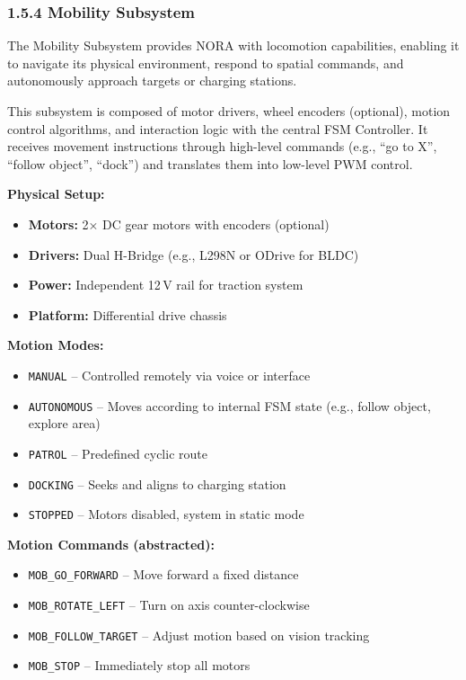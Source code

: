 \subsubsection*{1.5.4 Mobility Subsystem}

The Mobility Subsystem provides NORA with locomotion capabilities, enabling it to navigate its physical environment, respond to spatial commands, and autonomously approach targets or charging stations.

This subsystem is composed of motor drivers, wheel encoders (optional), motion control algorithms, and interaction logic with the central FSM Controller. It receives movement instructions through high-level commands (e.g., “go to X”, “follow object”, “dock”) and translates them into low-level PWM control.

\vspace{0.5cm}

\noindent\textbf{Physical Setup:}
\begin{itemize}
    \item \textbf{Motors:} 2× DC gear motors with encoders (optional)
    \item \textbf{Drivers:} Dual H-Bridge (e.g., L298N or ODrive for BLDC)
    \item \textbf{Power:} Independent 12 V rail for traction system
    \item \textbf{Platform:} Differential drive chassis
\end{itemize}

\vspace{0.5cm}

\noindent\textbf{Motion Modes:}
\begin{itemize}
    \item \texttt{MANUAL} – Controlled remotely via voice or interface
    \item \texttt{AUTONOMOUS} – Moves according to internal FSM state (e.g., follow object, explore area)
    \item \texttt{PATROL} – Predefined cyclic route
    \item \texttt{DOCKING} – Seeks and aligns to charging station
    \item \texttt{STOPPED} – Motors disabled, system in static mode
\end{itemize}

\vspace{0.5cm}

\noindent\textbf{Motion Commands (abstracted):}
\begin{itemize}
    \item \texttt{MOB\_GO\_FORWARD} – Move forward a fixed distance
    \item \texttt{MOB\_ROTATE\_LEFT} – Turn on axis counter-clockwise
    \item \texttt{MOB\_FOLLOW\_TARGET} – Adjust motion based on vision tracking
    \item \texttt{MOB\_STOP} – Immediately stop all motors
\end{itemize}

